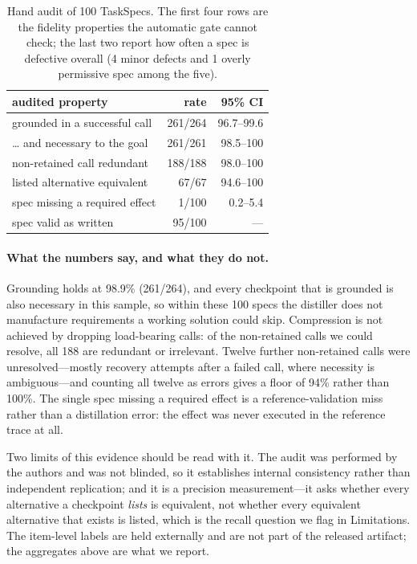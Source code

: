\begin{table}[h]
  \centering \footnotesize
  \setlength{\tabcolsep}{3pt}
  \begin{tabular}{lrr}
    \toprule
    audited property & rate & 95\% CI \\
    \midrule
    grounded in a successful call   & 261/264 & 96.7--99.6 \\
    \dots{} and necessary to the goal & 261/261 & 98.5--100 \\
    non-retained call redundant     & 188/188 & 98.0--100 \\
    listed alternative equivalent   &   67/67 & 94.6--100 \\
    spec missing a required effect  &   1/100 & 0.2--5.4 \\
    spec valid as written           &  95/100 & --- \\
    \bottomrule
  \end{tabular}
  \caption{Hand audit of 100 TaskSpecs. The first four rows are the fidelity
    properties the automatic gate cannot check; the last two report how often
    a spec is defective overall (4 minor defects and 1 overly permissive spec
    among the five).}
  \label{tab:fidelity}
\end{table}

\paragraph{What the numbers say, and what they do not.} Grounding holds at
98.9\% (261/264), and every checkpoint that is grounded is also necessary in
this sample, so within these 100 specs the distiller does not manufacture
requirements a working solution could skip. Compression is not achieved by
dropping load-bearing calls: of the non-retained calls we could resolve, all
188 are redundant or irrelevant. Twelve further non-retained calls were
unresolved---mostly recovery attempts after a failed call, where necessity is
ambiguous---and counting all twelve as errors gives a floor of 94\% rather
than 100\%. The single spec missing a required effect is a
reference-validation miss rather than a distillation error: the effect was
never executed in the reference trace at all.

Two limits of this evidence should be read with it. The audit was performed by
the authors and was not blinded, so it establishes internal consistency rather
than independent replication; and it is a precision measurement---it asks
whether every alternative a checkpoint \emph{lists} is equivalent, not whether
every equivalent alternative that exists is listed, which is the recall
question we flag in Limitations. The item-level labels are held externally and
are not part of the released artifact; the aggregates above are what we
report.


